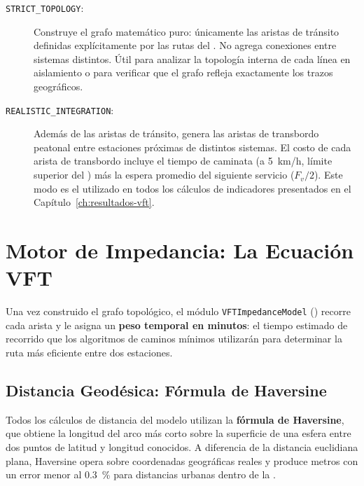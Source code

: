 \begin{description}
    \item[\texttt{STRICT\_TOPOLOGY}:]
    Construye el grafo matemático puro: únicamente las aristas de tránsito
    definidas explícitamente por las rutas del \geojson{}. No agrega conexiones
    entre sistemas distintos. Útil para analizar la topología interna de cada
    línea en aislamiento o para verificar que el grafo refleja exactamente los
    trazos geográficos.

    \item[\texttt{REALISTIC\_INTEGRATION}:]
    Además de las aristas de tránsito, genera las aristas de transbordo peatonal
    entre estaciones próximas de distintos sistemas. El costo de cada arista de
    transbordo incluye el tiempo de caminata (a 5~km/h, límite superior del
    \parencite{sedatu2019manual}) más la espera promedio del siguiente servicio
    ($F_v / 2$). Este modo es el utilizado en todos los cálculos de indicadores
    presentados en el Capítulo~\ref{ch:resultados-vft}.
\end{description}

\section{Motor de Impedancia: La Ecuación VFT}
\label{sec:vft-impedancia}

Una vez construido el grafo topológico, el módulo \texttt{VFTImpedanceModel}
() recorre cada arista y le asigna un
\textbf{peso temporal en minutos}: el tiempo estimado de recorrido que los
algoritmos de caminos mínimos utilizarán para determinar la ruta más eficiente
entre dos estaciones.

\subsection{Distancia Geodésica: Fórmula de Haversine}
\label{subsec:vft-haversine}

Todos los cálculos de distancia del modelo utilizan la \textbf{fórmula de
Haversine}, que obtiene la longitud del arco más corto sobre la superficie de
una esfera entre dos puntos de latitud y longitud conocidos. A diferencia de
la distancia euclidiana plana, Haversine opera sobre coordenadas geográficas
reales y produce metros con un error menor al 0.3~\% para distancias urbanas
dentro de la \zmvm{}.

